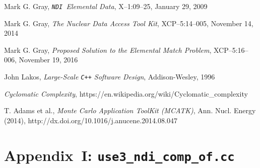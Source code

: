\documentclass[12pt]{lamemo}
\newcommand{\NDI}{\texttt{NDI}}
\begin{document}
\newpage
\begin{thebibliography}{99}

 Mark G. Gray, \emph{\NDI\ Elemental Data},
  X--1:09--25, January 29, 2009
  
 Mark G. Gray, \emph{The Nuclear Data Access Tool
  Kit}, XCP--5:14--005, November 14, 2014

 Mark G. Gray, \emph{Proposed Solution to the
    Elemental Match Problem}, XCP--5:16--006, November 19, 2016

 John Lakos, \emph{Large-Scale \texttt{C++} Software
    Design}, Addison-Wesley, 1996

 \emph{Cyclomatic Complexity}, 
  https://en.wikipedia.org/wiki/Cyclomatic\_complexity  

 T. Adams et al., \emph{Monte Carlo Application
  ToolKit (MCATK)}, Ann. Nucl. Energy (2014),
  http://dx.doi.org/10.1016/j.anucene.2014.08.047

\end{thebibliography}

\footnotesize
\newpage
\section{Appendix~I: \texttt{use3\_ndi\_comp\_of.cc}} 
\label{app:use3} 

\end{document}
